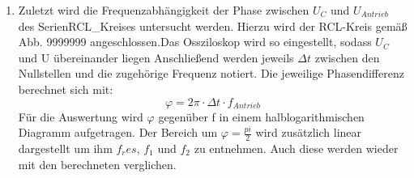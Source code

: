 \begin{enumerate}
         \item Zuletzt wird die Frequenzabhängigkeit der Phase zwischen $U_C$ und $U_{Antrieb}$ des
          SerienRCL_Kreises untersucht werden. Hierzu wird der RCL-Kreis gemäß Abb. 9999999
          angeschlossen.Das Ossziloskop wird so eingestellt, sodass $U_C$ und U übereinander liegen
             Anschließend werden jeweils
      $\Delta t$ zwischen den Nullstellen und die zugehörige Frequenz notiert. Die jeweilige
       Phasendifferenz berechnet sich mit:
       \begin{equation}
         \varphi = 2 \pi \cdot \Delta t \cdot f_{Antrieb}
       \end{equation}
       Für die Auswertung wird $\varphi$ gegenüber f in einem halblogarithmischen
        Diagramm aufgetragen. Der Bereich um $\varphi = \frac{pi}{2}$ wird zusätzlich
         linear dargestellt um ihm $f_res$, $f_1$ und $f_2$ zu entnehmen. Auch diese werden wieder
         mit den berechneten verglichen. 
\end{enumerate}
